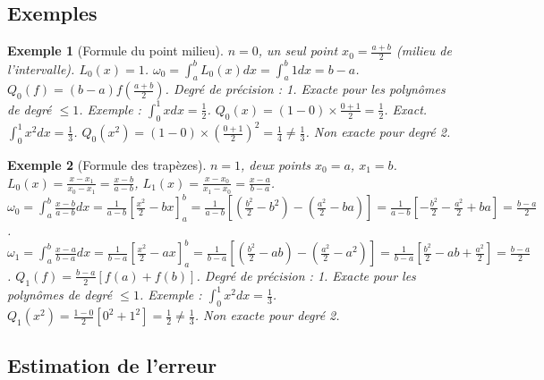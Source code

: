\documentclass{article}
\newtheorem{example}{Exemple}
\begin{document}
\subsection{Exemples}

\begin{example}[Formule du point milieu]
$n = 0$, un seul point $x_0 = \frac{a+b}{2}$ (milieu de l'intervalle).
$L_0(x) = 1$. $\omega_0 = \int_{a}^{b} L_0(x) dx = \int_{a}^{b} 1 dx = b - a$.
$Q_0(f) = (b - a) f\left(\frac{a+b}{2}\right)$.
Degré de précision : 1. Exacte pour les polynômes de degré $\leq 1$.
Exemple : $\int_{0}^{1} x dx = \frac{1}{2}$. $Q_0(x) = (1-0) \times \frac{0+1}{2} = \frac{1}{2}$. Exact.
$\int_{0}^{1} x^2 dx = \frac{1}{3}$. $Q_0(x^2) = (1-0) \times \left(\frac{0+1}{2}\right)^2 = \frac{1}{4} \neq \frac{1}{3}$. Non exacte pour degré 2.

\end{example}

\begin{example}[Formule des trapèzes]
$n = 1$, deux points $x_0 = a$, $x_1 = b$.
$L_0(x) = \frac{x - x_1}{x_0 - x_1} = \frac{x - b}{a - b}$, $L_1(x) = \frac{x - x_0}{x_1 - x_0} = \frac{x - a}{b - a}$.
$\omega_0 = \int_{a}^{b} \frac{x - b}{a - b} dx = \frac{1}{a - b} \left[\frac{x^2}{2} - bx\right]_{a}^{b} = \frac{1}{a - b} \left[ \left(\frac{b^2}{2} - b^2\right) - \left(\frac{a^2}{2} - ba\right) \right] = \frac{1}{a - b} \left[ -\frac{b^2}{2} - \frac{a^2}{2} + ba \right] = \frac{b - a}{2}$.
$\omega_1 = \int_{a}^{b} \frac{x - a}{b - a} dx = \frac{1}{b - a} \left[\frac{x^2}{2} - ax\right]_{a}^{b} = \frac{1}{b - a} \left[ \left(\frac{b^2}{2} - ab\right) - \left(\frac{a^2}{2} - a^2\right) \right] = \frac{1}{b - a} \left[ \frac{b^2}{2} - ab + \frac{a^2}{2} \right] = \frac{b - a}{2}$.
$Q_1(f) = \frac{b - a}{2} [f(a) + f(b)]$.
Degré de précision : 1. Exacte pour les polynômes de degré $\leq 1$.
Exemple : $\int_{0}^{1} x^2 dx = \frac{1}{3}$. $Q_1(x^2) = \frac{1 - 0}{2} [0^2 + 1^2] = \frac{1}{2} \neq \frac{1}{3}$. Non exacte pour degré 2.
\end{example}

\subsection{Estimation de l'erreur}
\end{document}
